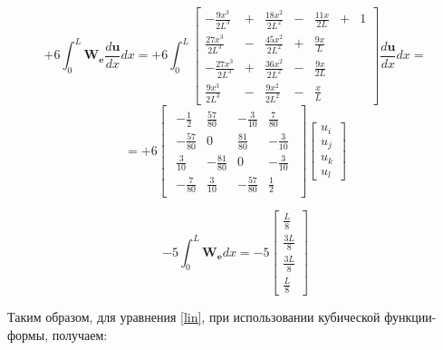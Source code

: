 $$
  +6  \int_0^L \mathbf{W_e} \frac{d \mathbf{u}}{dx} dx
=
  +6 \int_0^L
\begin{bmatrix}
  -\frac{9x^3}{2L^3}&+&\frac{18x^2}{2L^2}&-&\frac{11x}{2L} &+& 1\\
  \frac{27x^3}{2L^3}&-&\frac{45x^2}{2L^2}&+&\frac{9x}{L}&&\\
  -\frac{27x^3}{2L^3}&+&\frac{36x^2}{2L^2}&-&\frac{9x}{2L}&&\\
  \frac{9x^3}{2L^3}&-&\frac{9x^2}{2L^2}&-&\frac{x}{L}&&
\end{bmatrix}
\frac{d \mathbf{u}}{dx} dx
=
$$
$$
=
  +6 
\begin{bmatrix}
\begin{array}{rrrr}
	-\frac{1}{2} & \frac{57}{80} & -\frac{3}{10} & \frac{7}{80}\\
	-\frac{57}{80} & 0 & \frac{81}{80} & -\frac{3}{10} \\
	\frac{3}{10} & -\frac{81}{80} & 0 & -\frac{3}{10}\\
	-\frac{7}{80} & \frac{3}{10} & -\frac{57}{80} & \frac{1}{2}
\end{array}
\end{bmatrix}
\begin{bmatrix}
	u_i \\
	u_j \\
	u_k\\
	u_l
\end{bmatrix}
$$

$$
-5 \int_0^L \mathbf{W_e} d x
=
-5
\begin{bmatrix}
	\frac{L}{8} \\
	\frac{3L}{8}\\
	\frac{3L}{8}\\
	\frac{L}{8}
\end{bmatrix}
$$

\newpage
Таким образом, для уравнения \ref{lin}, при использовании кубической функции-формы,  получаем:

